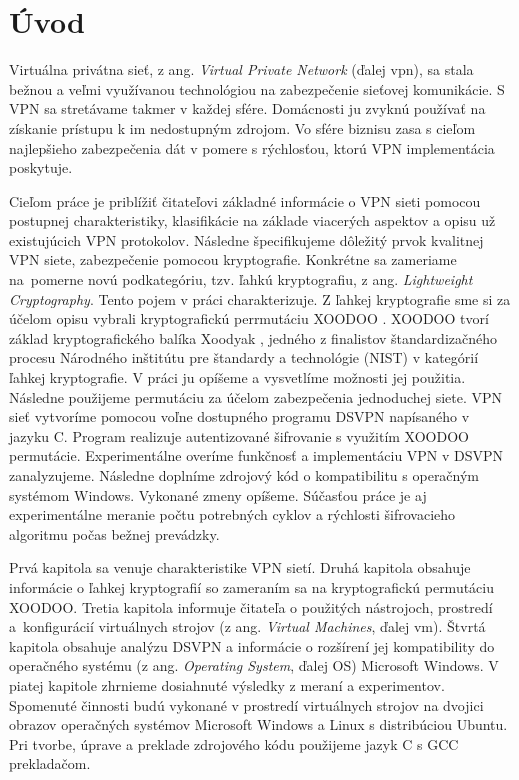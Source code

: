 
{}

\chapter*{Úvod}
Virtuálna privátna sieť, z ang. \textit{Virtual Private Network} (ďalej \acrshort{vpn}), sa stala bežnou a veľmi využívanou technológiou na zabezpečenie sieťovej komunikácie. S VPN sa stretávame takmer v každej sfére. Domácnosti ju zvyknú používať na získanie prístupu k im nedostupným zdrojom. Vo sfére biznisu zasa s cieľom najlepšieho zabezpečenia dát v pomere s rýchlosťou, ktorú VPN implementácia poskytuje. 

Cieľom práce je priblížiť čitateľovi základné informácie o VPN sieti pomocou postupnej charakteristiky, klasifikácie na základe viacerých aspektov a opisu už existujúcich VPN protokolov. Následne špecifikujeme dôležitý prvok kvalitnej VPN siete, zabezpečenie pomocou kryptografie. Konkrétne sa zameriame na~pomerne novú podkategóriu, tzv. ľahkú kryptografiu, z ang. \textit{Lightweight Cryptography}. Tento pojem v práci charakterizuje. Z ľahkej kryptografie sme si za účelom opisu vybrali kryptografickú perrmutáciu XOODOO \cite{xcb}. XOODOO tvorí základ kryptografického balíka Xoodyak \cite{tkecak}, jedného z finalistov štandardizačného procesu Národného inštitútu pre štandardy a technológie (NIST) v kategórií ľahkej kryptografie. V práci ju opíšeme a vysvetlíme možnosti jej použitia. Následne použijeme permutáciu za účelom zabezpečenia jednoduchej siete. VPN sieť vytvoríme pomocou voľne dostupného programu DSVPN napísaného v jazyku C. Program realizuje autentizované šifrovanie s využitím XOODOO permutácie. Experimentálne overíme funkčnosť a implementáciu VPN v DSVPN zanalyzujeme. Následne doplníme zdrojový kód o kompatibilitu s operačným systémom Windows. Vykonané zmeny opíšeme. Súčasťou práce je aj experimentálne meranie počtu potrebných cyklov a rýchlosti šifrovacieho algoritmu počas bežnej prevádzky. 

Prvá kapitola sa venuje charakteristike VPN sietí. Druhá kapitola obsahuje informácie o ľahkej kryptografií so zameraním sa na kryptografickú permutáciu XOODOO. Tretia kapitola informuje čitateľa o použitých nástrojoch, prostredí a~konfigurácií virtuálnych strojov (z ang. \textit{Virtual Machines}, ďalej \acrshort{vm}). Štvrtá kapitola obsahuje analýzu DSVPN a informácie o rozšírení jej kompatibility do operačného systému (z ang. \textit{Operating System}, ďalej OS) Microsoft Windows. V piatej kapitole zhrnieme dosiahnuté výsledky z meraní a experimentov. Spomenuté činnosti budú vykonané v prostredí virtuálnych strojov na dvojici obrazov operačných systémov Microsoft Windows a Linux s distribúciou Ubuntu. Pri tvorbe, úprave a preklade zdrojového kódu použijeme jazyk C s GCC prekladačom. 



